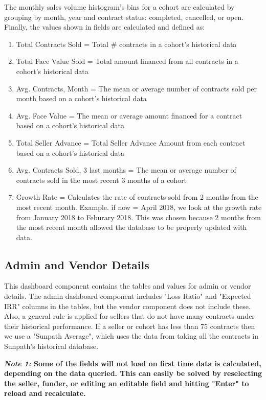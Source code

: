 \documentclass[titlepage]{article}
\begin{document}
The monthly sales volume histogram's bins for a cohort are calculated by grouping by month, year and contract status: completed, cancelled, or open. Finally, the values shown in fields are calculated and defined as:
\begin{enumerate}
	\item Total Contracts Sold = Total \# contracts in a cohort's historical data
	\item Total Face Value Sold = Total amount financed from all contracts in a cohort's historical data
	\item Avg. Contracts, Month = The mean or average number of contracts sold per month based on a cohort's historical data
	\item Avg. Face Value = The mean or average amount financed for a contract based on a cohort's historical data
	\item Total Seller Advance = Total Seller Advance Amount from each contract based on a cohort's historical data
	\item Avg. Contracts Sold, 3 last months = The mean or average number of contracts sold in the most recent 3 months of a cohort
	\item Growth Rate = Calculates the rate of contracts sold from 2 months from the most recent month. Example. if now = April 2018, we look at the growth rate from January 2018 to Feburary 2018. This was chosen because 2 months from the most recent month allowed the database to be properly updated with data.  
\end{enumerate}

\subsection{Admin and Vendor Details}\label{admin}
This dashboard component contains the tables and values for admin or vendor details. The admin dashboard component includes "Loss Ratio" and "Expected IRR" columns in the tables, but the vendor component does not include these. Also, a general rule is applied for sellers that do not have many contracts under their historical performance. If a seller or cohort has less than 75 contracts then we use a "Sunpath Average", which uses the data from taking all the contracts in Sunpath's historical database. 

\textbf{\emph{Note 1:} Some of the fields will not load on first time data is calculated, depending on the data queried. This can easily be solved by reselecting the seller, funder, or editing an editable field and hitting "Enter" to reload and recalculate.}
\end{document}
